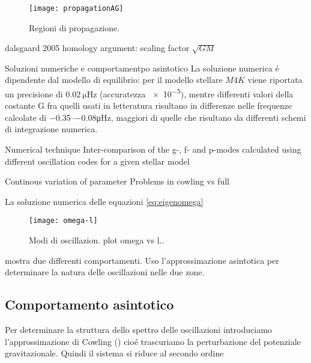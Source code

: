 \documentclass[../main.tex]{subfiles}
\begin{document}
\begin{figure}[!ht]
\centering
\texttt{[image: propagationAG]}
\caption{Regioni di propagazione.}
\end{figure}


\begin{todo}{dalsgaard 2005}
homology argument: scaling factor $\sqrt{GM}$
\end{todo}


\begin{todo}{Soluzioni numeriche e comportamentpo asintotico}
La soluzione numerica \'e dipendente dal modello di equilibrio: per il modello stellare $M4K$ viene riportata un precisione di $\SI{0.02}{\micro\hertz}$ (accuratezza \num{e-5}), mentre differenti valori della costante G fra quelli usati in letteratura risultano in differenze nelle frequenze calcolate di \numrange{-0.35}{-0.08}\si{\micro\hertz}, maggiori di quelle che risultano da differenti schemi di integrazione numerica.
\end{todo}

\begin{todo}{Numerical technique}
Inter-comparison of the g-, f- and p-modes calculated using different oscillation codes for a given stellar model

\end{todo}

\begin{todo}{Continous variation of parameter}
Problems in cowling vs full
\end{todo}

La soluzione numerica delle equazioni \eqref{eq:eigenomega}



\begin{figure}[!ht]
\centering
\texttt{[image: omega-l]}
\caption{Modi di oscillazion. plot omega vs l..}
\end{figure}

mostra due differenti comportamenti. Uso l'approssimazione asintotica per determinare la natura delle oscillazioni nelle due zone.

\clearpage

\subsection{Comportamento asintotico}


Per determinare la struttura dello spettro delle oscillazioni introduciamo l'approssimazione di Cowling (\cite{cow41oscillations}) cio\'e trascuriamo la perturbazione del potenziale gravitazionale. Quindi il sistema si riduce al secondo ordine
\end{document}
